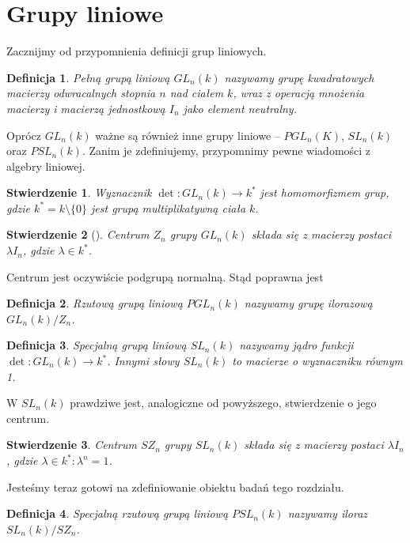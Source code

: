 \documentclass[licencjacka]{pracamgr}
\newtheorem{deff}{Definicja}[section]
\newtheorem{fact}{Stwierdzenie}[section]
\begin{document}
\section{Grupy liniowe}

Zacznijmy od przypomnienia definicji grup liniowych.

\begin{deff}
  \emph{Pełną grupą liniową $GL_n(k)$} nazywamy grupę kwadratowych macierzy odwracalnych 
  stopnia $n$ nad ciałem $k$, wraz z operacją mnożenia macierzy i macierzą jednostkową $I_n$
  jako element neutralny.
\end{deff}

Oprócz $GL_n(k)$ ważne są również inne grupy liniowe -- $PGL_n(K)$, $SL_n(k)$ oraz $PSL_n(k)$.
Zanim je zdefiniujemy, przypomnimy pewne wiadomości z algebry liniowej.

\begin{fact}
  Wyznacznik $\det \colon GL_n(k) \to k^*$ jest homomorfizmem grup, 
  gdzie $k^* = k \setminus \{0\}$ jest grupą multiplikatywną ciała $k$.
\end{fact}

\begin{fact}[{\cite[str. 47]{BB}}]
  Centrum $Z_n$ grupy $GL_n(k)$ składa się z macierzy postaci $\lambda I_n$, 
  gdzie $\lambda \in k^*$.
\end{fact}

Centrum jest oczywiście podgrupą normalną. Stąd poprawna jest

\begin{deff}
  \emph{Rzutową grupą liniową $PGL_n(k)$} nazywamy grupę ilorazową $GL_n(k) / Z_n$.
\end{deff}

\begin{deff}
  \emph{Specjalną grupą liniową $SL_n(k)$} nazywamy jądro funkcji $\det \colon GL_n(k) \to k^*$.
  Innymi słowy $SL_n(k)$ to macierze o wyznaczniku równym 1.
\end{deff}

W $SL_n(k)$ prawdziwe jest, analogiczne od powyższego, stwierdzenie o jego centrum.

\begin{fact}
  Centrum $SZ_n$ grupy $SL_n(k)$ składa się z macierzy postaci $\lambda I_n$, 
  gdzie $\lambda \in k^* \colon \lambda^n = 1$.
\end{fact}

Jesteśmy teraz gotowi na zdefiniowanie obiektu badań tego rozdziału.

\begin{deff}
  \emph{Specjalną rzutową grupą liniową $PSL_n(k)$} nazywamy iloraz $SL_n(k) / SZ_n$.
\end{deff}
\end{document}
